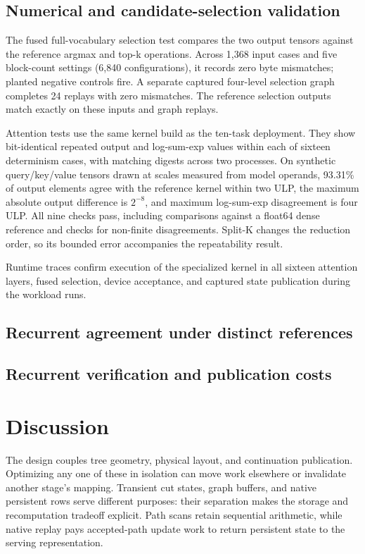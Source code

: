 \documentclass[conference]{IEEEtran}
\begin{document}
\subsection{Numerical and candidate-selection validation}
\label{sec:current-validation}


The fused full-vocabulary selection test compares the two output tensors against the reference argmax and top-k operations. Across 1,368 input cases and five block-count settings (6,840 configurations), it records zero byte mismatches; planted negative controls fire. A separate captured four-level selection graph completes 24 replays with zero mismatches. The reference selection outputs match exactly on these inputs and graph replays.

Attention tests use the same kernel build as the ten-task deployment. They show bit-identical repeated output and log-sum-exp values within each of sixteen determinism cases, with matching digests across two processes. On synthetic query/key/value tensors drawn at scales measured from model operands, 93.31\% of output elements agree with the reference kernel within two ULP, the maximum absolute output difference is $2^{-8}$, and maximum log-sum-exp disagreement is four ULP. All nine checks pass, including comparisons against a float64 dense reference and checks for non-finite disagreements. Split-K changes the reduction order, so its bounded error accompanies the repeatability result.

Runtime traces confirm execution of the specialized kernel in all sixteen attention layers, fused selection, device acceptance, and captured state publication during the workload runs.

\subsection{Recurrent agreement under distinct references}
\label{sec:m1-qualification}


\subsection{Recurrent verification and publication costs}
\label{sec:mechanism-costs}


\section{Discussion}
\label{sec:discussion}
The design couples tree geometry, physical layout, and continuation publication. Optimizing any one of these in isolation can move work elsewhere or invalidate another stage's mapping. Transient cut states, graph buffers, and native persistent rows serve different purposes: their separation makes the storage and recomputation tradeoff explicit. Path scans retain sequential arithmetic, while native replay pays accepted-path update work to return persistent state to the serving representation.
\end{document}
